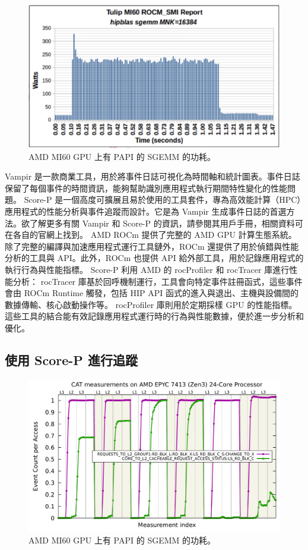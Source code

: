 \begin{figure}
    \centering
    \includegraphics[width=0.9\linewidth]{FileAusiliari/Screenshots/Figure13-7.png}
    \caption{AMD MI60 GPU 上有 PAPI 的 SGEMM 的功耗。}
    \label{fig:PAPI7}
\end{figure}

Vampir 是一款商業工具，用於將事件日誌可視化為時間軸和統計圖表。事件日誌保留了每個事件的時間資訊，能夠幫助識別應用程式執行期間特性變化的性能問題。
Score-P 是一個高度可擴展且易於使用的工具套件，專為高效能計算（HPC）應用程式的性能分析與事件追蹤而設計。它是為 Vampir 生成事件日誌的首選方法。欲了解更多有關 Vampir 和 Score-P 的資訊，請參閱其用戶手冊，相關資料可在各自的官網上找到。
AMD ROCm 提供了完整的 AMD GPU 計算生態系統。除了完整的編譯與加速應用程式運行工具鏈外，ROCm 還提供了用於偵錯與性能分析的工具與 API。此外，ROCm 也提供 API 給外部工具，用於記錄應用程式的執行行為與性能指標。
Score-P 利用 AMD 的 rocProfiler 和 rocTracer 庫進行性能分析：
rocTracer 庫基於回呼機制運行，工具會向特定事件註冊函式，這些事件會由 ROCm Runtime 觸發，包括 HIP API 函式的進入與退出、主機與設備間的數據傳輸、核心啟動操作等。
rocProfiler 庫則用於定期採樣 GPU 的性能指標。
這些工具的結合能有效記錄應用程式運行時的行為與性能數據，便於進一步分析和優化。

\subsection{使用 Score-P 進行追蹤}

\begin{figure}
    \centering
    \includegraphics[width=0.9\linewidth]{FileAusiliari/Screenshots/Figure13-8.png}
    \caption{AMD MI60 GPU 上有 PAPI 的 SGEMM 的功耗。}
    \label{fig:PAPI8}
\end{figure}

